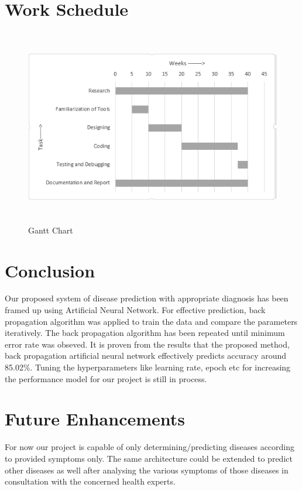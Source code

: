 {\section{Work Schedule}
\begin{figure}[h]
\begin{center}
\includegraphics[width=150mm, height = 86mm]{images/GanttChart.PNG}
\caption{Gantt Chart}
\end{center}
\end{figure}

\section{Conclusion}
 
Our proposed system of disease prediction with appropriate diagnosis has 
been framed up using Artificial Neural Network. For effective prediction, 
back propagation algorithm was applied to train the data and compare the 
parameters iteratively. The back propagation algorithm has been repeated until 
minimum error rate was obseved. It is proven from the results that the proposed 
method, back propagation artificial neural network effectively predicts accuracy 
around 85.02\%. Tuning the hyperparameters like learning rate, epoch etc for 
increasing the performance model for our project is still in process. 


\section{Future Enhancements}

For now our project is capable of only determining/predicting diseases according to provided
symptoms only. The same architecture could be extended to predict other diseases as well
after analysing the various symptoms of those diseases in consultation with the concerned 
health experts. 

}
